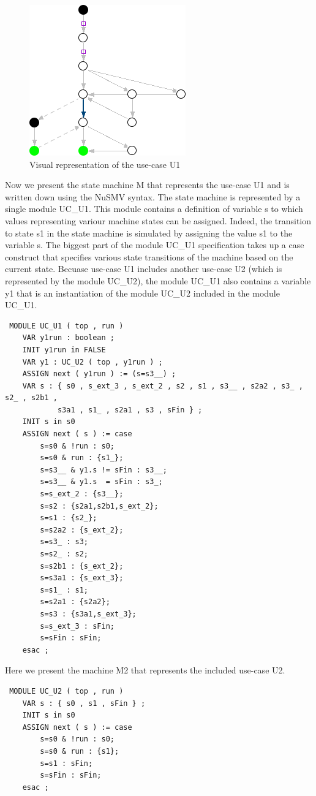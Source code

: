 \begin{figure}[h]
  \centering
  \includegraphics{images/uc1}
  \caption{Visual representation of the use-case U1}
  \label{fig:use-case U1}
\end{figure}

Now we present the state machine M that represents the use-case U1 and is written down using the NuSMV syntax. The state machine is
represented by a single module UC\_U1. This module contains a definition of variable s to which values representing variour machine
states can be assigned. Indeed, the transition to state s1 in the state machine is simulated by assigning the value s1 to the
variable s. The biggest part of the module UC\_U1 specification takes up a case construct that specifies various state transitions
of the machine based on the current state. Becuase use-case U1 includes another use-case U2 (which is represented by the module
UC\_U2), the module UC\_U1 also contains a variable y1 that is an instantiation of the module UC\_U2 included in the module UC\_U1.
\begin{lstlisting}
 MODULE UC_U1 ( top , run )
	VAR y1run : boolean ;
	INIT y1run in FALSE
	VAR y1 : UC_U2 ( top , y1run ) ;
	ASSIGN next ( y1run ) := (s=s3__) ;
	VAR s : { s0 , s_ext_3 , s_ext_2 , s2 , s1 , s3__ , s2a2 , s3_ , s2_ , s2b1 ,
			s3a1 , s1_ , s2a1 , s3 , sFin } ;
	INIT s in s0
	ASSIGN next ( s ) := case
		s=s0 & !run : s0;
		s=s0 & run : {s1_};
		s=s3__ & y1.s != sFin : s3__;
		s=s3__ & y1.s  = sFin : s3_;
		s=s_ext_2 : {s3__};
		s=s2 : {s2a1,s2b1,s_ext_2};
		s=s1 : {s2_};
		s=s2a2 : {s_ext_2};
		s=s3_ : s3;
		s=s2_ : s2;
		s=s2b1 : {s_ext_2};
		s=s3a1 : {s_ext_3};
		s=s1_ : s1;
		s=s2a1 : {s2a2};
		s=s3 : {s3a1,s_ext_3};
		s=s_ext_3 : sFin;
		s=sFin : sFin;
	esac ;
\end{lstlisting}

Here we present the machine M2 that represents the included use-case U2.
\begin{lstlisting}
 MODULE UC_U2 ( top , run )
	VAR s : { s0 , s1 , sFin } ;
	INIT s in s0
	ASSIGN next ( s ) := case
		s=s0 & !run : s0;
		s=s0 & run : {s1};
		s=s1 : sFin;
		s=sFin : sFin;
	esac ;
\end{lstlisting}

